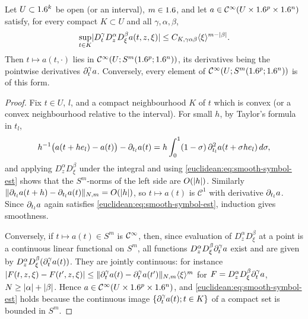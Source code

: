 \begin{lemma}\label{euclidean:lem:smooth-symbols}
  Let $U\subset1.6^k$ be open \textup{(}or an interval\textup{)}, $m\in1.6$,
  and let $a\in\mathcal{C}^\infty(U\times1.6^p\times1.6^n)$ satisfy, for every compact
  $K\subset U$ and all $\gamma,\alpha,\beta$,
  \begin{equation}\label{euclidean:eq:smooth-symbol-est}
    \sup_{t\in K}\lvert D^\gamma_tD^\alpha_zD^\beta_\xi a(t,z,\xi)\rvert\le
    C_{K,\gamma\alpha\beta}\langle \xi\rangle^{m-\lvert \beta\rvert}.
  \end{equation}
  Then $t\mapsto a(t,\cdot)$ lies in $\mathcal{C}^\infty(U;S^m(1.6^p;1.6^n))$, its
  derivatives being the pointwise derivatives $\partial^\gamma_ta$. Conversely,
  every element of $\mathcal{C}^\infty(U;S^m(1.6^p;1.6^n))$ is of this form.
\end{lemma}
\begin{proof}
  Fix $t\in U$, $l$, and a compact neighbourhood $K$ of $t$ which is convex
  (or a convex neighbourhood relative to the interval). For small $h$, by Taylor's formula in $t_l$,
  \begin{equation*}
    h^{-1}\bigl(a(t+he_l)-a(t)\bigr)-\partial_{t_l}a(t)
    =h\int_0^1(1-\sigma)\,\partial_{t_l}^2a(t+\sigma he_l)\,d\sigma,
  \end{equation*}
  and applying $D^\alpha_zD^\beta_\xi$ under the integral and using
  \eqref{euclidean:eq:smooth-symbol-est} shows that the $S^m$-norms of the left side
  are $O(\lvert h\rvert)$. Similarly
  $\lVert \partial_{t_l}a(t+h)-\partial_{t_l}a(t)\rVert_{N,m}=O(\lvert h\rvert)$, so
  $t\mapsto a(t)$ is $\mathcal C^1$ with derivative $\partial_{t_l}a$. Since
  $\partial_{t_l}a$ again satisfies \eqref{euclidean:eq:smooth-symbol-est}, induction gives
  smoothness.

  Conversely, if $t\mapsto a(t)\in S^m$ is $\mathcal{C}^\infty$, then, since evaluation of
  $D^\alpha_zD^\beta_\xi$ at a point is a continuous linear functional on
  $S^m$, all functions $D^\alpha_zD^\beta_\xi\partial^\gamma_ta$ exist and are given by
  $D^\alpha_zD^\beta_\xi(\partial_t^\gamma a(t))$. They are jointly continuous: for
  instance
  $\lvert F(t,z,\xi)-F(t',z,\xi)\rvert\le\lVert \partial_t^\gamma a(t)-\partial^\gamma_ta(t')\rVert_{N,m}\langle \xi\rangle^{m}$
  for $F=D^\alpha_zD^\beta_\xi\partial^\gamma_ta$, $N\ge\lvert \alpha\rvert+\lvert \beta\rvert$. Hence
  $a\in\mathcal{C}^\infty(U\times1.6^p\times1.6^n)$, and
  \eqref{euclidean:eq:smooth-symbol-est} holds because the continuous image
  $\{\partial^\gamma_ta(t);t\in K\}$ of a compact set is bounded in $S^m$.
\end{proof}

